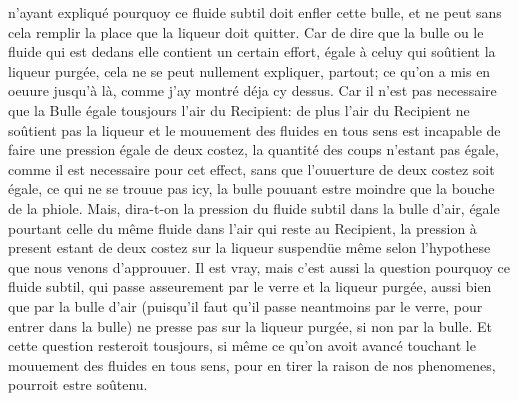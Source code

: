 n'ayant expliqu\'{e} pourquoy ce fluide subtil\protect{} doit enfler cette bulle, et ne peut sans cela remplir la place que la liqueur doit quitter. Car de dire que la bulle ou le fluide qui est dedans elle contient un certain effort, \'{e}gale \`{a} celuy qui so\^{u}tient la liqueur purg\'{e}e\protect{}, cela ne se peut nullement expliquer, partout; ce qu'on a mis en oeuure jusqu'à là, comme j'ay montré déja cy dessus. Car il n'est pas necessaire que la Bulle égale tousjours l'air du Recipient: de plus l'air du Recipient ne soûtient pas la liqueur et le mouuement des fluides en tous sens est incapable de faire une pression égale de deux costez, la quantité des coups n'estant pas égale, comme il est necessaire pour cet effect, sans que l'ouuerture de deux costez soit égale, ce qui ne se trouue pas icy, la bulle pouuant estre moindre que la bouche de la phiole. Mais, dira-t-on la pression du fluide subtil dans la bulle d'air, égale pourtant celle du même fluide dans l'air qui reste au Recipient, la pression à present estant de deux costez sur la liqueur suspendüe même selon l'hypothese que nous venons d'approuuer. Il est vray, mais c'est aussi la question pourquoy ce fluide subtil, qui passe asseurement par le verre et la liqueur purgée, aussi bien que par la bulle d'air (puisqu'il faut qu'il passe neantmoins par le verre, pour entrer dans la bulle) ne presse pas sur la liqueur purgée, si non par la bulle. Et cette question resteroit tousjours, si même ce qu'on avoit avancé touchant le mouuement des fluides en tous sens,  pour en tirer la raison de nos phenomenes, pourroit estre soûtenu. %
